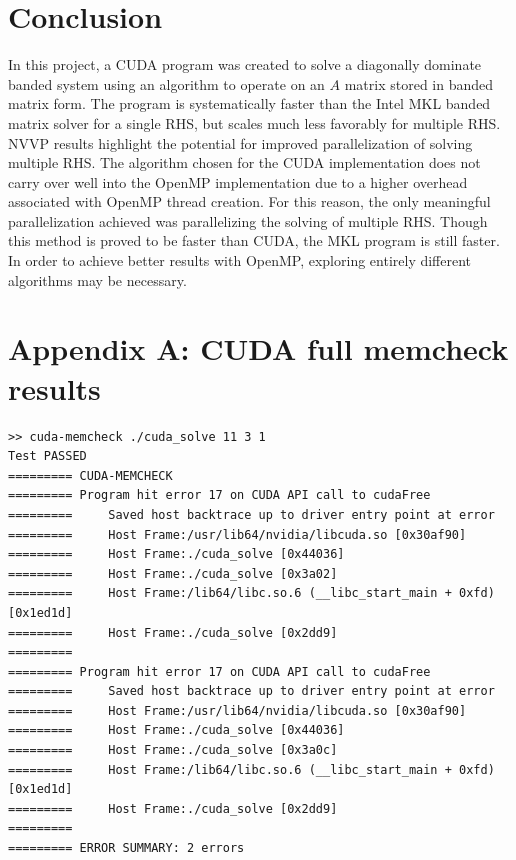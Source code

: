\documentclass[12pt]{article}
\begin{document}
\section{Conclusion}
\label{sec:conclusion}

In this project, a CUDA program was created to solve a diagonally dominate
banded system using an algorithm to operate on an $A$ matrix stored in banded
matrix form. The program is systematically faster than the Intel MKL banded
matrix solver for a single RHS, but scales much less favorably for multiple
RHS. NVVP results highlight the potential for improved parallelization of
solving multiple RHS. The algorithm chosen for the CUDA implementation does not
carry over well into the OpenMP implementation due to a higher overhead
associated with OpenMP thread creation. For this reason, the only meaningful
parallelization achieved was parallelizing the solving of multiple RHS. Though
this method is proved to be faster than CUDA, the MKL program is still faster.
In order to achieve better results with OpenMP, exploring entirely different
algorithms may be necessary.




\newpage
\section{Appendix A: CUDA full memcheck results}

\begin{verbatim}
>> cuda-memcheck ./cuda_solve 11 3 1
Test PASSED
========= CUDA-MEMCHECK
========= Program hit error 17 on CUDA API call to cudaFree
=========     Saved host backtrace up to driver entry point at error
=========     Host Frame:/usr/lib64/nvidia/libcuda.so [0x30af90]
=========     Host Frame:./cuda_solve [0x44036]
=========     Host Frame:./cuda_solve [0x3a02]
=========     Host Frame:/lib64/libc.so.6 (__libc_start_main + 0xfd) [0x1ed1d]
=========     Host Frame:./cuda_solve [0x2dd9]
=========
========= Program hit error 17 on CUDA API call to cudaFree
=========     Saved host backtrace up to driver entry point at error
=========     Host Frame:/usr/lib64/nvidia/libcuda.so [0x30af90]
=========     Host Frame:./cuda_solve [0x44036]
=========     Host Frame:./cuda_solve [0x3a0c]
=========     Host Frame:/lib64/libc.so.6 (__libc_start_main + 0xfd) [0x1ed1d]
=========     Host Frame:./cuda_solve [0x2dd9]
=========
========= ERROR SUMMARY: 2 errors
\end{verbatim}
\end{document}
